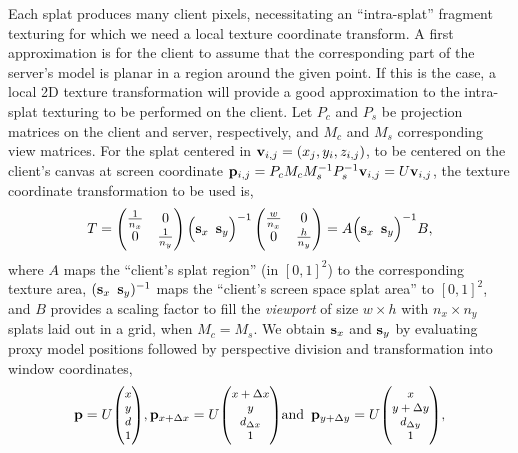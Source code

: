 Each splat produces many client pixels, necessitating an ``intra-splat''
fragment texturing for which we need a local texture coordinate transform.
A first approximation is for the client to assume that the corresponding part of
the server's model is planar in a region around the given point. If this is the
case, a local 2D texture transformation will provide a good approximation to the
intra-splat texturing to be performed on the client. Let $P_c$ and $P_s$ be
projection matrices on the client and server, respectively, and $M_c$ and $M_s$
corresponding view matrices. For the splat centered in $\mathbf{v}_{i, j} = (x_j, y_i,
z_{i, j})$, to be centered on the client's canvas at screen coordinate $\mathbf{p}_{i,
j} = P_c M_c M_s^{-1} P_s^{-1}\mathbf{v}_{i, j} = U\mathbf{v}_{i, j}$, the texture coordinate
transformation to be used is,
\[
  T =
  \begin{pmatrix}
    \frac{1}{n_x} & 0 \\
    0 & \frac{1}{n_y}
  \end{pmatrix}
  \Big( \mathbf{s}_x \, \, \, \mathbf{s}_y \Big)^{-1}
  \begin{pmatrix} 
    \frac{w}{n_x} & 0 \\
     0 & \frac{h}{n_y}
  \end{pmatrix}
   =
  A
  \Big( \mathbf{s}_x \, \, \, \mathbf{s}_y \Big)^{-1}
  B,
\]
where $A$ maps the ``client's splat region'' (in $[0, 1]^2$) to the
corresponding texture area, $(\mathbf{s}_{x} \, \, \, \mathbf{s}_{y})^{-1}$ maps the
``client's screen space splat area'' to $[0, 1]^2$, and $B$ provides a scaling
factor to fill the {\em viewport} of size $w \times h$ with $n_x \times n_y$
splats laid out in a grid, when $M_c=M_s$.
%
%
We obtain $\mathbf{s}_{x}$ and $\mathbf{s}_{y}$ by evaluating proxy model positions followed by 
perspective division and transformation into window coordinates,
\[
  \pv =
  U { \small \begin{pmatrix} x \\ y \\ d \\ 1 \end{pmatrix} },
  \pv_{x+\Delta x} =
  U { \small \begin{pmatrix} x+\Delta x \\ y \\ d_{\Delta x} \\ 1 \end{pmatrix} }
  \text{and}\, \, \, 
  \pv_{y+\Delta y} =
  U { \small \begin{pmatrix} x \\ y+\Delta y \\ d_{\Delta y} \\ 1 \end{pmatrix} },
\]
